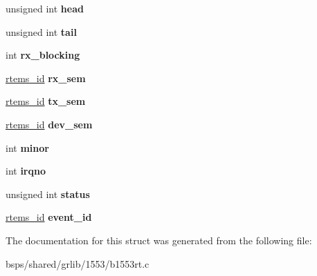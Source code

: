 \begin{DoxyCompactItemize}
\item 
\mbox{\label{structrt__priv_acd8485927170e1e649f683284808b27a}} 
unsigned int {\bfseries head}
\item 
\mbox{\label{structrt__priv_ae27d5869e63031e276678236e6953521}} 
unsigned int {\bfseries tail}
\item 
\mbox{\label{structrt__priv_a366c1226da99c7359540236a1685e3d0}} 
int {\bfseries rx\+\_\+blocking}
\item 
\mbox{\label{structrt__priv_a5d5c0a9c28eeb0fed90832aba09a66a5}} 
\mbox{\hyperlink{group__ClassicTasks_gab20892b814dced7dd4e5b9bf42becd57}{rtems\+\_\+id}} {\bfseries rx\+\_\+sem}
\item 
\mbox{\label{structrt__priv_a8362d26606e226d3b8ad26700e8ce632}} 
\mbox{\hyperlink{group__ClassicTasks_gab20892b814dced7dd4e5b9bf42becd57}{rtems\+\_\+id}} {\bfseries tx\+\_\+sem}
\item 
\mbox{\label{structrt__priv_a0554d9af70c204bac59a7bdcd1a57882}} 
\mbox{\hyperlink{group__ClassicTasks_gab20892b814dced7dd4e5b9bf42becd57}{rtems\+\_\+id}} {\bfseries dev\+\_\+sem}
\item 
\mbox{\label{structrt__priv_a3cc58a412ae02abff5c74f5cf3cc86d4}} 
int {\bfseries minor}
\item 
\mbox{\label{structrt__priv_a9d05e9368f6aa66a3400c4c4a93ce2c9}} 
int {\bfseries irqno}
\item 
\mbox{\label{structrt__priv_a3680ae8e2589be613ff3e2f145891860}} 
unsigned int {\bfseries status}
\item 
\mbox{\label{structrt__priv_a0dc0e3868ed9d3dca52d7ecfc059961b}} 
\mbox{\hyperlink{group__ClassicTasks_gab20892b814dced7dd4e5b9bf42becd57}{rtems\+\_\+id}} {\bfseries event\+\_\+id}
\end{DoxyCompactItemize}


The documentation for this struct was generated from the following file\+:\begin{DoxyCompactItemize}
\item 
bsps/shared/grlib/1553/b1553rt.\+c\end{DoxyCompactItemize}
